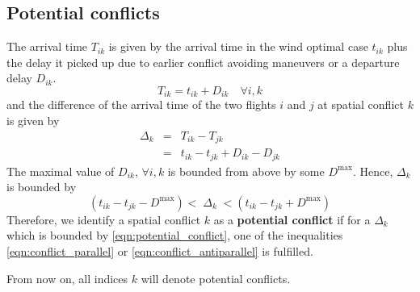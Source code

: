 \documentclass{article}
\begin{document}
\subsection{Potential conflicts}
The arrival time $T_{ik}$ is given by the arrival time in the wind optimal case $t_{ik}$ plus the delay it picked up due to earlier conflict avoiding maneuvers or a departure delay $D_{ik}$. 
\begin{equation*}
    T_{ik} = t_{ik} + D_{ik} \quad \forall i, k
\end{equation*}
and the difference of the arrival time of the two flights $i$ and $j$ at spatial conflict $k$ is given by
\begin{eqnarray*}
    \Delta_k &=& T_{ik} - T_{jk} \\
             &=& t_{ik} - t_{jk} + D_{ik} - D_{jk}
\end{eqnarray*}
The maximal value of $D_{ik}$, $\forall i, k$ is bounded from above by some $D^{\text{max}}$.
Hence, $\Delta_k$ is bounded by
\begin{equation} \label{eqn:potential_conflict}
    (t_{ik} - t_{jk} - D^{\text{max}})< \; \Delta_k \; < (t_{ik} - t_{jk} + D^{\text{max}})
\end{equation}
Therefore, we identify a spatial conflict $k$ as a \textbf{potential conflict} if for a $\Delta_k$ which is bounded by \eqref{eqn:potential_conflict}, one of the inequalities \eqref{eqn:conflict_parallel} or \eqref{eqn:conflict_antiparallel} is fulfilled.

From now on, all indices $k$ will denote potential conflicts.
\end{document}
